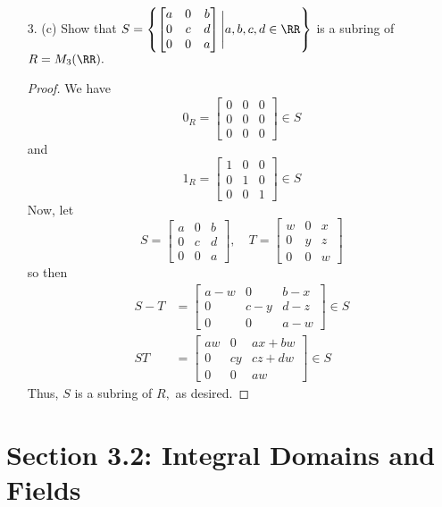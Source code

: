 \documentclass{article}
\begin{document}
\begin{itemize}
	\item[3.] (c) Show that $S=\left\{ \begin{bmatrix}
		a & 0 & b \\ 0 & c & d \\ 0 & 0 & a
	\end{bmatrix}\Bigg\vert a, b, c, d\in \RR\right\}$ is a subring of $R=M_3(\RR).$
		\begin{proof}
			We have \[0_R=\begin{bmatrix}
					0 & 0 & 0 \\ 0 & 0 & 0 \\ 0 & 0 & 0
			\end{bmatrix}\in S\] and \[1_R=\begin{bmatrix}
					1 & 0 & 0 \\ 0 & 1 & 0 \\ 0 & 0 & 1
			\end{bmatrix}\in S\] Now, let \[S=\begin{bmatrix}
					a & 0 & b \\ 0 & c & d \\ 0 & 0 & a
				\end{bmatrix}, \quad T =\begin{bmatrix}
					w & 0 & x \\ 0 & y & z \\ 0 & 0 & w
			\end{bmatrix}\] so then
			\begin{align*}
				S-T &= \begin{bmatrix}
					a-w & 0 & b-x \\ 
					0 & c-y & d-z \\
					0 & 0 & a-w
				\end{bmatrix}\in S \\
				ST &= \begin{bmatrix}
					aw & 0 & ax+bw \\
					0 & cy & cz+dw \\
					0 & 0 & aw
				\end{bmatrix}\in S
			\end{align*} 
			Thus, $S$ is a subring of $R,$ as desired.
			
		\end{proof}
		
\end{itemize}

\section*{Section 3.2: Integral Domains and Fields}
\end{document}
